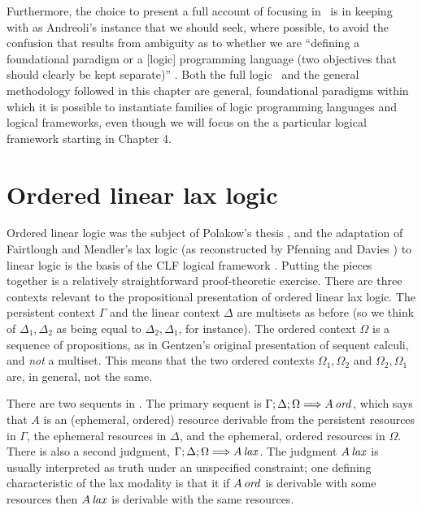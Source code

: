 Furthermore, the choice to present a full account of focusing in
\ollll~is in keeping with as Andreoli's instance that we should seek,
where possible, to avoid the confusion that results from ambiguity as
to whether we are ``defining a foundational paradigm or a [logic]
programming language (two objectives that should clearly be kept
separate)'' \cite{andreoli01focussing}. Both the full logic \ollll~and
the general methodology followed in this chapter are general,
foundational paradigms within which it is possible to instantiate
families of logic programming languages and logical frameworks, even
though we will focus on the a particular logical framework starting in
Chapter 4.

\section{Ordered linear lax logic}
\label{sec:ord-unfocused}

Ordered linear logic was the subject of Polakow's thesis
\cite{polakow01ordered}, and the adaptation of Fairtlough and
Mendler's lax logic \cite{fairtlough95propositional} (as reconstructed
by Pfenning and Davies \cite{pfenning01judgmental}) to linear logic is
the basis of the CLF logical framework
\cite{watkins02concurrent}. Putting the pieces together is a
relatively straightforward proof-theoretic exercise. There are three
contexts relevant to the propositional presentation of ordered linear
lax logic.  The persistent context $\Gamma$ and the linear context
$\Delta$ are multisets as before (so we think of $\Delta_1, \Delta_2$
as being equal to $\Delta_2, \Delta_1$, for instance). The ordered
context $\Omega$ is a sequence of propositions, as in Gentzen's
original presentation of sequent calculi, and {\it not} a multiset.
This means that the two ordered contexts $\Omega_1, \Omega_2$ and
$\Omega_2, \Omega_1$ are, in general, not the same.



There are two sequents in \ollll.  The primary sequent is
${\Gamma};{\Delta};{\Omega} \Longrightarrow {{A}\,{{\it ord}}} \mathstrut$, which says that $A$ is an
(ephemeral, ordered) resource derivable from the persistent resources
in $\Gamma$, the ephemeral resources in $\Delta$, and the ephemeral,
ordered resources in $\Omega$. There is also a second judgment,
${\Gamma};{\Delta};{\Omega} \Longrightarrow {{A}\,{{\it lax}}} \mathstrut$. The judgment ${A}\,{{\it lax}}$
is usually interpreted as truth under an unspecified constraint; one
defining characteristic of the lax modality is that it if ${A}\,{{\it ord}}$
is derivable with some resources then ${A}\,{{\it lax}}$ is derivable with
the same resources.

